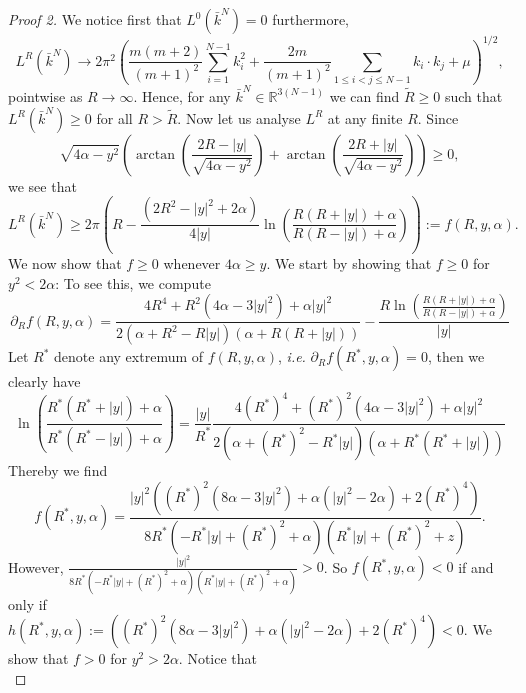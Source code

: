 \documentclass[a4paper,11pt]{article}
\newcommand{\abs}[1]{\left\lvert #1 \right\rvert}
\newcommand{\ie}{\emph{i.e.} }
\newcommand{\R}{\mathbb{R}}
\numberwithin{equation}{section}
\begin{document}
\begin{proof}[Proof 2]
	We notice first that $ L^0(\bar{k}^N)=0 $ furthermore, \begin{equation}
	L^R(\bar{k}^N)\to2\pi^2\left(\frac{m(m+2)}{(m+1)^2}\sum_{i=1}^{N-1}k_i^2+\frac{2m}{(m+1)^2}\sum_{1\leq i<j\leq N-1}k_i\cdot k_j+\mu\right)^{1/2},
	\end{equation} pointwise as $ R\to\infty $. Hence, for any $ \bar{k}^N\in\R^{3(N-1)} $ we can find $ \tilde{R}\geq0 $ such that $ L^R(\bar{k}^N)\geq0 $ for all $ R>\tilde{R} $. Now let us analyse $ L^R $ at any finite $ R $. Since\begin{equation}
	\sqrt{4\alpha-y^2}\left(\arctan\left(\frac{2R-\abs{y}}{\sqrt{4\alpha-y^2}}\right)+\arctan\left(\frac{2R+\abs{y}}{\sqrt{4\alpha-y^2}}\right)\right)\geq0,
	\end{equation} we see that
	\begin{equation}
	L^R(\bar{k}^N)\geq2\pi\left( R-\frac{(2R^2-\abs{y}^2+2\alpha)}{4\abs{y}}\ln\left(\frac{R(R+\abs{y})+\alpha}{R(R-\abs{y})+\alpha}\right)\right):=f(R,y,\alpha).
	\end{equation}
	We now show that $ f\geq0 $ whenever $ 4\alpha\geq y $. We start by showing that $ f\geq0 $ for $ y^2<2\alpha $: To see this, we compute \begin{equation}
	\partial_R f(R,y,\alpha)=\frac{4 R^4+R^2 \left(4 \alpha -3 \abs{y}^2\right)+\alpha  \abs{y}^2}{2 \left(\alpha +R^2-R \abs{y}\right) (\alpha +R (R+\abs{y}))}-\frac{R \ln\left(\frac{R(R+\abs{y})+\alpha}{R(R-\abs{y})+\alpha}\right)}{\abs{y}}
	\end{equation}
	Let $ R^* $ denote any extremum of $ f(R,y,\alpha) $, \ie $ \partial_R f(R^*,y,\alpha)=0 $, then we clearly have \begin{equation}
	\ln\left(\frac{R^*(R^*+\abs{y})+\alpha}{R^*(R^*-\abs{y})+\alpha}\right)=\frac{\abs{y}}{R^*}\frac{4 (R^*)^{4}+(R^*)^{2} \left(4 \alpha -3 \abs{y}^2\right)+\alpha  \abs{y}^2}{2 \left(\alpha +(R^*)^{2}-R^* \abs{y}\right) (\alpha +R^* (R^*+\abs{y}))}
	\end{equation}
	Thereby we find \begin{equation}
	f(R^*,y,\alpha)=\frac{\left| y\right| ^2 \left((R^*)^2 \left(8 \alpha-3 \left| y\right| ^2\right)+\alpha \left(\left| y\right| ^2-2 \alpha\right)+2 (R^*)^4\right)}{8 R^* \left(-R^* \left| y\right| +(R^*)^2+\alpha\right) \left(R^* \left| y\right| +(R^*)^2+z\right)}.
	\end{equation}
	However, $ \frac{\left| y\right| ^2}{8 R^* \left(-R^* \left| y\right| +(R^*)^2+\alpha\right) \left(R^* \left| y\right| +(R^*)^2+\alpha\right)}>0 $. So $ f(R^*,y,\alpha)<0 $ if and only if\\ $ h(R^*,y,\alpha):=\left((R^*)^2 \left(8 \alpha-3 \left| y\right| ^2\right)+\alpha \left(\left| y\right| ^2-2 \alpha\right)+2 (R^*)^4\right)<0 $. We show that $ f>0 $ for $ y^2>2\alpha $. Notice that \begin{equation}

\end{equation}
\end{proof}
\end{document}
